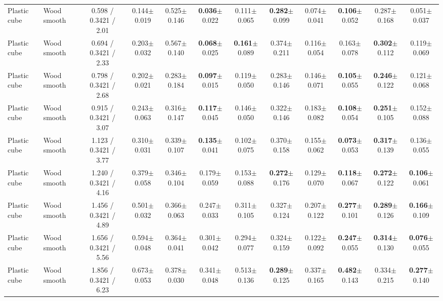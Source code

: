 \begin{table}[t]
{\begin{tabular}{l l c c c c c c c c c c }
        Plastic cube & Wood smooth & 0.598 / 0.3421 / 2.01 & 0.144$\pm$0.019 & 0.525$\pm$0.146 & \textbf{0.036}$\pm$0.022 & 0.111$\pm$0.065 & \textbf{0.282}$\pm$0.099 & 0.074$\pm$0.041 & \textbf{0.106}$\pm$0.052 & 0.287$\pm$0.168 & 0.051$\pm$0.037 \\
        Plastic cube & Wood smooth & 0.694 / 0.3421 / 2.33 & 0.203$\pm$0.032 & 0.567$\pm$0.140 & \textbf{0.068}$\pm$0.025 & \textbf{0.161}$\pm$0.089 & 0.374$\pm$0.211 & 0.116$\pm$0.054 & 0.163$\pm$0.078 & \textbf{0.302}$\pm$0.112 & 0.119$\pm$0.069 \\
        Plastic cube & Wood smooth & 0.798 / 0.3421 / 2.68 & 0.202$\pm$0.021 & 0.283$\pm$0.184 & \textbf{0.097}$\pm$0.015 & 0.119$\pm$0.050 & 0.283$\pm$0.146 & 0.146$\pm$0.071 & \textbf{0.105}$\pm$0.055 & \textbf{0.246}$\pm$0.122 & 0.121$\pm$0.068 \\
        Plastic cube & Wood smooth & 0.915 / 0.3421 / 3.07 & 0.243$\pm$0.063 & 0.316$\pm$0.147 & \textbf{0.117}$\pm$0.045 & 0.146$\pm$0.050 & 0.322$\pm$0.146 & 0.183$\pm$0.082 & \textbf{0.108}$\pm$0.054 & \textbf{0.251}$\pm$0.105 & 0.152$\pm$0.088 \\
        Plastic cube & Wood smooth & 1.123 / 0.3421 / 3.77 & 0.310$\pm$0.031 & 0.339$\pm$0.107 & \textbf{0.135}$\pm$0.041 & 0.102$\pm$0.075 & 0.370$\pm$0.158 & 0.155$\pm$0.062 & \textbf{0.073}$\pm$0.053 & \textbf{0.317}$\pm$0.139 & 0.136$\pm$0.055 \\
        Plastic cube & Wood smooth & 1.240 / 0.3421 / 4.16 & 0.379$\pm$0.058 & 0.346$\pm$0.104 & 0.179$\pm$0.059 & 0.153$\pm$0.088 & \textbf{0.272}$\pm$0.176 & 0.129$\pm$0.070 & \textbf{0.118}$\pm$0.067 & \textbf{0.272}$\pm$0.122 & \textbf{0.106}$\pm$0.061 \\
        Plastic cube & Wood smooth & 1.456 / 0.3421 / 4.89 & 0.501$\pm$0.032 & 0.366$\pm$0.063 & 0.247$\pm$0.033 & 0.311$\pm$0.105 & 0.327$\pm$0.124 & 0.207$\pm$0.122 & \textbf{0.277}$\pm$0.101 & \textbf{0.289}$\pm$0.126 & \textbf{0.166}$\pm$0.109 \\
        Plastic cube & Wood smooth & 1.656 / 0.3421 / 5.56 & 0.594$\pm$0.048 & 0.364$\pm$0.041 & 0.301$\pm$0.042 & 0.294$\pm$0.077 & 0.324$\pm$0.159 & 0.122$\pm$0.092 & \textbf{0.247}$\pm$0.055 & \textbf{0.314}$\pm$0.130 & \textbf{0.076}$\pm$0.055 \\
        Plastic cube & Wood smooth & 1.856 / 0.3421 / 6.23 & 0.673$\pm$0.053 & 0.378$\pm$0.030 & 0.341$\pm$0.048 & 0.513$\pm$0.136 & \textbf{0.289}$\pm$0.125 & 0.337$\pm$0.165 & \textbf{0.482}$\pm$0.143 & 0.334$\pm$0.215 & \textbf{0.277}$\pm$0.140 \\

\end{tabular}}
\end{table}
